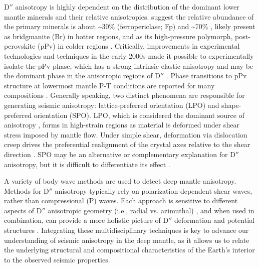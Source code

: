 \documentclass{standard}
\begin{document}
D$''$ anisotropy is highly dependent on the distribution of the dominant lower mantle minerals and their relative anisotropies. \textcite{hirose205MineralogyDeep2015} suggest the relative abundance of the primary minerals is about \textasciitilde30\%  (ferropericlase; Fp) and \textasciitilde70\% , likely present as bridgmanite (Br) in hotter regions, and as its high-pressure polymorph, post-perovskite (pPv) in colder regions \parencite{hirose205MineralogyDeep2015}. Critically, improvements in experimental technologies and techniques in the early 2000s made it possible to experimentally isolate the pPv phase, which has a strong intrinsic elastic anisotropy and may be the dominant phase in the anisotropic regions of D$''$  \parencite{oganovTheoreticalExperimentalEvidence2004,murakamiPostPerovskitePhaseTransition2004}. Phase transitions to pPv structure at lowermost mantle P-T conditions are reported for many compositions \parencite{hirosePostperovskitePhaseTransition2006}.
Generally speaking, two distinct phenomena are responsible for generating seismic anisotropy: lattice-preferred orientation (LPO) and shape-preferred orientation (SPO). LPO, which is considered the dominant source of anisotropy \parencite{savageSeismicAnisotropyMantle1999}, forms in high-strain regions as material is deformed under shear stress imposed by mantle flow. Under simple shear, deformation via dislocation creep drives the preferential realignment of the crystal axes relative to the shear direction \parencite{kocksTextureAnisotropyPreferred2000}. SPO may be an alternative or complementary explanation for D$''$ anisotropy, but it is difficult to differentiate its effect \parencite{reissLowermostMantleAnisotropy2019}.

A variety of body wave methods are used to detect deep mantle anisotropy. Methods for D$''$ anisotropy typically rely on polarization-dependent shear waves, rather than compressional (P) waves. Each approach is sensitive to different aspects of D$''$ anisotropic geometry (i.e., radial vs. azimuthal) \parencite{wolfAdvancesMappingLowermost2024}, and when used in combination, can provide a more holistic picture of D$''$ deformation and potential structures \parencite{romanowiczAnisotropyDeepEarth2017}. Integrating these multidisciplinary techniques is key to advance our understanding of seismic anisotropy in the deep mantle, as it allows us to relate the underlying structural and compositional characteristics of the Earth's interior to the observed seismic properties.
\end{document}
